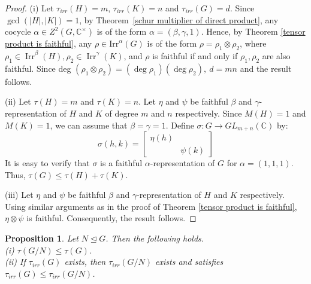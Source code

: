 \documentclass[a4paper,11pt]{amsart}
\numberwithin{equation}{section}
\numberwithin{equation}{subsection}
\newtheorem{proposition}[theorem]{Proposition}
\begin{document}
	\begin{proof} 
		(i) Let $\tau_{{irr}}(H)=m$,  $\tau_{irr}(K)=n$ and $\tau_{irr}(G)=d$. 
		Since $\gcd(|H|, |K|) = 1$, by Theorem~\ref{schur multiplier of direct product}, any cocycle $\alpha \in Z^2(G,\mathbb{C}^\times)$ is of the form $\alpha = (\beta, \gamma, 1).$ 
		Hence, by Theorem \ref{tensor product is faithful}, any $\rho \in \mathrm{Irr}^\alpha(G)$ is of the form $\rho = \rho_{1} \otimes \rho_{2}$, where $\rho_{1} \in \operatorname{Irr}^{\beta}(H), \rho_{2} \in \operatorname{Irr}^{\gamma}(K)$, and
		$\rho$ is faithful if and only if $\rho_{1}, \rho_{2}$ are also faithful. Since 
		deg $(\rho_{1} \otimes \rho_{2}) =(\operatorname{deg} \rho_{1})(\operatorname{deg} \rho_{2}), ~d = mn$ and the result follows.
		
		
		(ii) Let $\tau(H)= m$ and $\tau(K)= n$. Let $\eta$ and $\psi$ be faithful $\beta$ and $\gamma$-representation of $H$ and $K$ of degree $m$ and $n$ respectively. Since $M(H)=1$ and $M(K)=1$, we can assume that $\beta= \gamma=1$. Define $\sigma: G \to GL_{m+n}(\mathbb{C})$ by:
		\[
		\sigma(h,k)= \begin{bmatrix}
			\eta(h) &  \\
			& \psi(k)
		\end{bmatrix}
		\]
		It is easy to verify that $\sigma$ is a faithful $\alpha$-representation of $G$ for $\alpha =(1,1,1)$. Thus, $\tau(G) \leq \tau(H) + \tau(K)$.
		
		(iii) Let $\eta$ and $\psi$ be faithful $\beta$ and $\gamma$-representation of $H$ and $K$ respectively. Using similar arguments as in the proof of Theorem \ref{tensor product is faithful}, $\eta \otimes \psi$ is faithful. Consequently, the result follows.   
	\end{proof}
	
	\iffalse
	\begin{proposition} Let $N \trianglelefteq G$. Then the following holds. \\
		(i) $\tau(G/N) \leq \tau(G)$. \\
		(ii) If $\tau_{irr}(G)$ exists, then $\tau_{irr}(G/N)$ exists and satisfies $\tau_{irr}(G) \leq \tau_{irr}(G/N)$.  
	\end{proposition}
	
\end{document}
